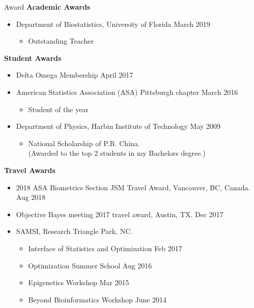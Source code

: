 \documentclass{resume} %
\begin{document}
\begin{rSection}{Award}
\textbf{Academic Awards}
\begin{itemize}[noitemsep,topsep=0pt]
\item  Department of Biostatistics, University of Florida \hfill March 2019
\begin{itemize}[noitemsep,topsep=0pt]
\item Outstanding Teacher
\end{itemize}
\end{itemize}


\textbf{Student Awards}
\begin{itemize}[noitemsep,topsep=0pt]
\item  Delta Omega Membership \hfill April 2017
\item American Statistics Association (ASA) Pittsburgh chapter  \hfill March 2016
\begin{itemize}[noitemsep,topsep=0pt]
\item Student of the year
\end{itemize}
\item Department of Physics, Harbin Institute of Technology \hfill May 2009
\begin{itemize}[noitemsep,topsep=0pt]
\item National Scholarship of P.R. China. \\(Awarded to the top 2 students in my Bachelors degree.)
\end{itemize}
\end{itemize}


\textbf{Travel Awards} 

\begin{itemize}[noitemsep,topsep=0pt]
\item 2018 ASA Biometrics Section JSM Travel Award, Vancouver, BC, Canada. \hfill Aug 2018
\end{itemize}

\begin{itemize}[noitemsep,topsep=0pt]
\item Objective Bayes meeting 2017 travel award, Austin, TX. \hfill Dec 2017
\end{itemize}

\begin{itemize}[noitemsep,topsep=0pt]
\item SAMSI, Research Triangle Park, NC.	
\begin{itemize}[noitemsep,topsep=0pt]
\item {Interface of Statistics and Optimization} \hfill Feb 2017
\item {Optimization Summer School} \hfill Aug 2016
\item {Epigenetics Workshop} \hfill Mar 2015
\item {Beyond Bioinformatics Workshop} \hfill June 2014
\end{itemize}

\end{itemize}

\end{rSection}
\end{document}
